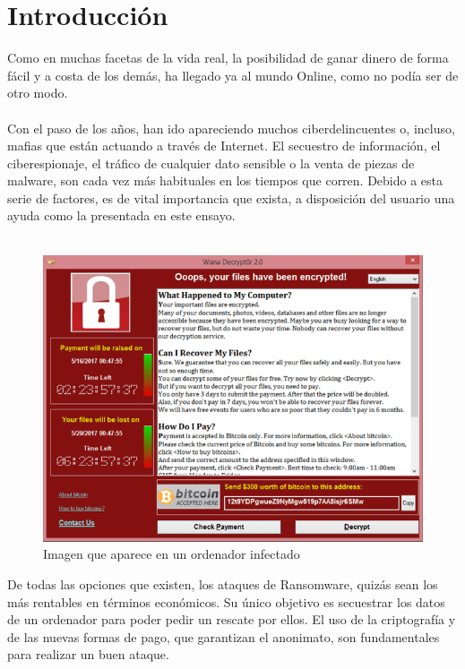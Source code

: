 \documentclass[a4paper,12pt]{article}
\begin{document}
\section{Introducción}
Como en muchas facetas de la vida real, la posibilidad de ganar dinero de forma fácil y a costa de los demás, ha llegado ya al mundo Online, como no podía ser de otro modo.\\\\
Con el paso de los años, han ido apareciendo muchos ciberdelincuentes o, incluso, mafias que están actuando a través de Internet. El secuestro de información, el ciberespionaje, el tráfico de cualquier dato sensible o la venta de piezas de malware, son cada vez más habituales en los tiempos que corren. Debido a esta serie de factores, es de vital importancia que exista, a disposición del usuario una ayuda como la presentada en este ensayo.\\\\
\begin{figure}[H]
	\centering
	\includegraphics[scale=0.7]{imagenes/screenshot.png}
	\caption[Imagen que aparece en un ordenador infectado]{Imagen que aparece en un ordenador infectado}
\end{figure}
De todas las opciones que existen, los ataques de Ransomware, quizás sean los más rentables en términos económicos. Su único objetivo es secuestrar los datos de un ordenador para poder pedir un rescate por ellos. El uso de la criptografía y de las nuevas formas de pago, que garantizan el anonimato, son fundamentales para realizar un buen ataque.\\\\
\end{document}
